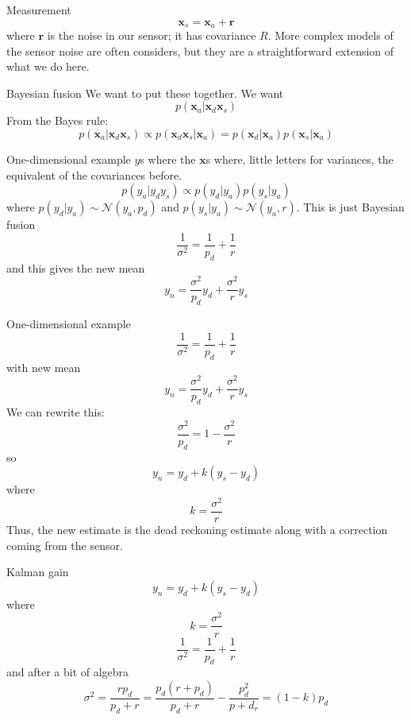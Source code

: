 \documentclass{beamer}
\newcommand{\crish}{\color{reddish}}
\newcommand{\cbla}{\color{black}}
\begin{document}
\begin{frame}{Measurement}
  \crish$$
\mathbf{x}_s=\mathbf{x}_a+\mathbf{r}
$$\cbla{} where \crish$\mathbf{r}$\cbla{} is the noise in our sensor;
it has covariance \crish$R$\cbla. More complex models of the sensor
noise are often considers, but they are a straightforward extension of
what we do here.
\end{frame}

\begin{frame}{Bayesian fusion}
  We want to put these together. We want
  \crish$$p(\mathbf{x}_a|\mathbf{x}_d\mathbf{x}_s)$$\cbla{}
From the Bayes rule:
\crish$$
p(\mathbf{x}_a|\mathbf{x}_d\mathbf{x}_s)\propto p(\mathbf{x}_d\mathbf{x}_s|\mathbf{x}_a)=p(\mathbf{x}_d|\mathbf{x}_a)p(\mathbf{x}_s|\mathbf{x}_a)
$$\cbla{}
\end{frame}

\begin{frame}{One-dimensional example}
  \crish$y$\cbla{}s where the \crish$\mathbf{x}$\cbla{}s where, little letters for variances, the equivalent of the covariances before.
\crish$$
p(y_a|y_dy_s)\propto p(y_d|y_a)p(y_s|y_a)
$$\cbla{} where \crish$p(y_d|y_a)\sim\mathcal{N}(y_a,p_d)$\cbla{} and
\crish$p(y_s|y_a)\sim\mathcal{N}(y_a,r)$\cbla{}.
\vskip 1cm
This is just Bayesian fusion
\crish$$
\frac{1}{\sigma^2}=\frac{1}{p_d}+\frac{1}{r}
$$\cbla{}
and this gives the new mean
\crish$$
y_n=\frac{\sigma^2}{p_d}y_d+\frac{\sigma^2}{r}y_s
$$\cbla{}

\end{frame}


\begin{frame}{One-dimensional example}
\crish$$
\frac{1}{\sigma^2}=\frac{1}{p_d}+\frac{1}{r}
$$\cbla{}
with new mean
\crish$$
y_n=\frac{\sigma^2}{p_d}y_d+\frac{\sigma^2}{r}y_s
$$\cbla{}
We can rewrite this:
\crish$$
\frac{\sigma^2}{p_d}=1-\frac{\sigma^2}{r}
$$\cbla{}
so
\crish$$
y_n=y_d+k(y_s-y_d)
$$\cbla{}
where
\crish$$
k=\frac{\sigma^2}{r}
$$\cbla{}
Thus, the new estimate is the dead reckoning estimate along with a correction coming from the sensor. 
\end{frame}

\begin{frame}{Kalman gain}
\crish$$
y_n=y_d+k(y_s-y_d)
$$\cbla{}
where
\crish $$
k=\frac{\sigma^2}{r}
$$ \cbla{}
\crish$$
\frac{1}{\sigma^2}=\frac{1}{p_d}+\frac{1}{r}
$$\cbla{}
and after a bit of algebra
\crish$$
\sigma^2=\frac{rp_d}{p_d+r}=\frac{p_d(r+p_d)}{p_d+r}-\frac{p_d^2}{p+d_r}=(1-k)p_d
$$\cbla{}
\end{frame}
\end{document}
